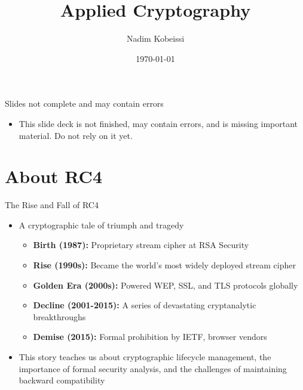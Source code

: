 \documentclass[aspectratio=169, lualatex, handout]{beamer}
\title{Applied Cryptography}
\author{Nadim Kobeissi}
\institute{American University of Beirut}
\date{\today}
\begin{document}
\begin{frame}[plain]
	\titlepage
\end{frame}

\begin{frame}{Slides not complete and may contain errors}
	\begin{itemize}
		\item This slide deck is not finished, may contain errors, and is missing important material. Do not rely on it yet.
	\end{itemize}
\end{frame}

\section{About RC4}

\begin{frame}{The Rise and Fall of RC4}
	\begin{itemize}[<+->]
		\item A cryptographic tale of triumph and tragedy
		      \begin{itemize}[<+->]
			      \item \textbf{Birth (1987):} Proprietary stream cipher at RSA Security
			      \item \textbf{Rise (1990s):} Became the world's most widely deployed stream cipher
			      \item \textbf{Golden Era (2000s):} Powered WEP, SSL, and TLS protocols globally
			      \item \textbf{Decline (2001-2015):} A series of devastating cryptanalytic breakthroughs
			      \item \textbf{Demise (2015):} Formal prohibition by IETF, browser vendors
		      \end{itemize}
		\item This story teaches us about cryptographic lifecycle management, the importance of formal security analysis, and the challenges of maintaining backward compatibility
	\end{itemize}
\end{frame}
\end{document}
